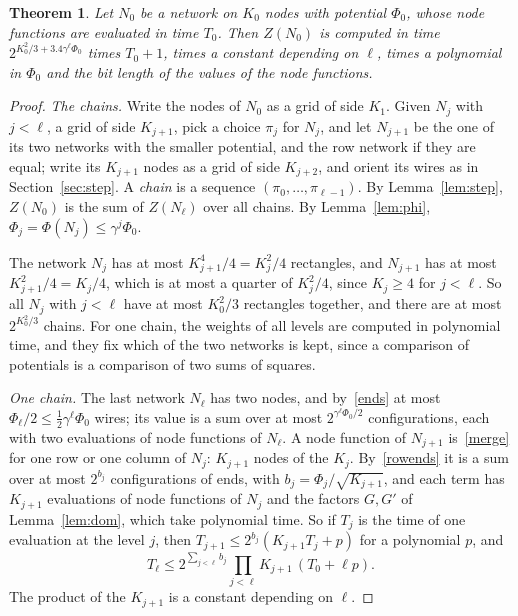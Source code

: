 \documentclass[11pt]{article}
\newtheorem{theorem}{Theorem}
\begin{document}
\begin{theorem}\label{thm:net}
Let $N_0$ be a network on $K_0$ nodes with potential $\Phi_0$, whose node functions are evaluated in time $T_0$. Then $Z(N_0)$ is computed in time $2^{K_0^2/3+3.4\gamma^\ell\Phi_0}$ times $T_0+1$, times a constant depending on $\ell$, times a polynomial in $\Phi_0$ and the bit length of the values of the node functions.
\end{theorem}

\begin{proof}
\emph{The chains.} Write the nodes of $N_0$ as a grid of side $K_1$. Given $N_j$ with $j<\ell$, a grid of side $K_{j+1}$, pick a choice $\pi_j$ for $N_j$, and let $N_{j+1}$ be the one of its two networks with the smaller potential, and the row network if they are equal; write its $K_{j+1}$ nodes as a grid of side $K_{j+2}$, and orient its wires as in Section~\ref{sec:step}. A \emph{chain} is a sequence $(\pi_0,\dots,\pi_{\ell-1})$. By Lemma~\ref{lem:step}, $Z(N_0)$ is the sum of $Z(N_\ell)$ over all chains. By Lemma~\ref{lem:phi}, $\Phi_j=\Phi(N_j)\le\gamma^j\Phi_0$.

The network $N_j$ has at most $K_{j+1}^4/4=K_j^2/4$ rectangles, and $N_{j+1}$ has at most $K_{j+1}^2/4=K_j/4$, which is at most a quarter of $K_j^2/4$, since $K_j\ge4$ for $j<\ell$. So all $N_j$ with $j<\ell$ have at most $K_0^2/3$ rectangles together, and there are at most $2^{K_0^2/3}$ chains. For one chain, the weights of all levels are computed in polynomial time, and they fix which of the two networks is kept, since a comparison of potentials is a comparison of two sums of squares.

\emph{One chain.} The last network $N_\ell$ has two nodes, and by~\eqref{ends} at most $\Phi_\ell/2\le\frac12\gamma^\ell\Phi_0$ wires; its value is a sum over at most $2^{\gamma^\ell\Phi_0/2}$ configurations, each with two evaluations of node functions of $N_\ell$. A node function of $N_{j+1}$ is~\eqref{merge} for one row or one column of $N_j$: $K_{j+1}$ nodes of the $K_j$. By~\eqref{rowends} it is a sum over at most $2^{b_j}$ configurations of ends, with $b_j=\Phi_j/\sqrt{K_{j+1}}$, and each term has $K_{j+1}$ evaluations of node functions of $N_j$ and the factors $G,G'$ of Lemma~\ref{lem:dom}, which take polynomial time. So if $T_j$ is the time of one evaluation at the level $j$, then $T_{j+1}\le2^{b_j}(K_{j+1}T_j+p)$ for a polynomial $p$, and
\[
T_\ell\le2^{\sum_{j<\ell}b_j}\prod_{j<\ell}K_{j+1}\,(T_0+\ell p).
\]
The product of the $K_{j+1}$ is a constant depending on $\ell$.


\end{proof}
\end{document}
